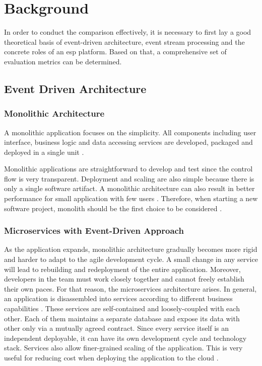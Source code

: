 \chapter{Background} \label{chap:background}
In order to conduct the comparison effectively, it is necessary to first lay a good theoretical basis of event-driven architecture, event stream processing and the concrete roles of an \acrshort{esp} platform. Based on that, a comprehensive set of evaluation metrics can be determined.


\section{Event Driven Architecture}
\subsection{Monolithic Architecture}
A monolithic application focuses on the simplicity. All components including user interface, business logic and data accessing services are developed, packaged and deployed in a single unit \cite{monolith}.

Monolithic applications are straightforward to develop and test since the control flow is very transparent. Deployment and scaling are also simple because there is only a single software artifact. A monolithic architecture can also result in better performance for small application with few users \cite{al2018comparative}. Therefore, when starting a new software project, monolith should be the first choice to be considered \cite{monolithfirst}. 

\subsection{Microservices with Event-Driven Approach}
As the application expands, monolithic architecture gradually becomes more rigid and harder to adapt to the agile development cycle. A small change in any service will lead to rebuilding and redeployment of the entire application. Moreover, developers in the team must work closely together and cannot freely establish their own paces. For that reason, the microservices architecture arises. In general, an application is disassembled into services according to different business capabilities \cite{microservicesfowler}. These services are self-contained and loosely-coupled with each other. Each of them maintains a separate database and expose its data with other only via a mutually agreed contract. Since every service itself is an independent deployable, it can have its own development cycle and technology stack. Services also allow finer-grained scaling of the application. This is very useful for reducing cost when deploying the application to the cloud \cite{villamizar2016infrastructure}.


